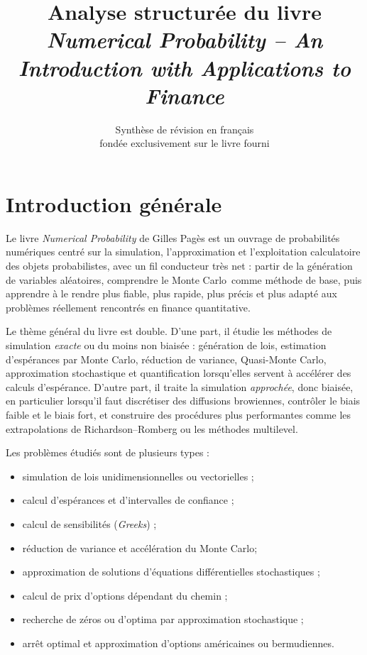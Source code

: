 \documentclass[11pt,a4paper]{article}
\title{\textbf{Analyse structurée du livre}\\[0.3em]
\emph{Numerical Probability -- An Introduction with Applications to Finance}}
\author{Synthèse de révision en français\\ fondée exclusivement sur le livre fourni}
\date{}
\newcommand{\mc}{Monte Carlo}
\newcommand{\qmc}{Quasi-Monte Carlo}
\begin{document}
\maketitle
\tableofcontents
\clearpage

\section{Introduction générale}

Le livre \emph{Numerical Probability} de Gilles Pagès est un ouvrage de probabilités numériques centré sur la simulation, l'approximation et l'exploitation calculatoire des objets probabilistes, avec un fil conducteur très net : partir de la génération de variables aléatoires, comprendre le \mc\ comme méthode de base, puis apprendre à le rendre plus fiable, plus rapide, plus précis et plus adapté aux problèmes réellement rencontrés en finance quantitative.

Le thème général du livre est double. D'une part, il étudie les méthodes de simulation \emph{exacte} ou du moins non biaisée : génération de lois, estimation d'espérances par \mc, réduction de variance, \qmc, approximation stochastique et quantification lorsqu'elles servent à accélérer des calculs d'espérance. D'autre part, il traite la simulation \emph{approchée}, donc biaisée, en particulier lorsqu'il faut discrétiser des diffusions browiennes, contrôler le biais faible et le biais fort, et construire des procédures plus performantes comme les extrapolations de Richardson--Romberg ou les méthodes multilevel.

Les problèmes étudiés sont de plusieurs types :
\begin{itemize}
  \item simulation de lois unidimensionnelles ou vectorielles ;
  \item calcul d'espérances et d'intervalles de confiance ;
  \item calcul de sensibilités (\emph{Greeks}) ;
  \item réduction de variance et accélération du \mc ;
  \item approximation de solutions d'équations différentielles stochastiques ;
  \item calcul de prix d'options dépendant du chemin ;
  \item recherche de zéros ou d'optima par approximation stochastique ;
  \item arrêt optimal et approximation d'options américaines ou bermudiennes.
\end{itemize}
\end{document}
